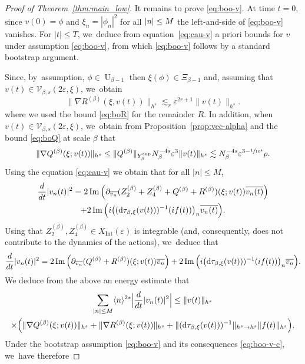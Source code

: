 \documentclass[JEP,XML,SOM,Unicode,published]{cedram}
\theoremstyle{plain}
\theoremstyle{definition}
\newcommand{\1}{\mathbf{1}}
\newcommand{\Ysup}[1]{Y_{#1}^{\mathrm{sup}}}
\let\epsilon\varepsilon
\begin{document}
\begin{proof}[Proof of Theorem~\ref{thm:main_low}]
It remains to prove \eqref{eq:boo-v}. At time $t=0$, since $v(0)=\phi$ and $\xi_{n}=|\phi_{n}|^{2}$ for all $|n|\leq\nobreak M$ the left-and-side of \eqref{eq:boo-v} vanishes. For $|t|\leq T$, we~deduce from equation~\eqref{eq:cau-v} a priori bounds for $v$ under assumption \eqref{eq:boo-v}, from which \eqref{eq:boo-v} follows by a standard bootstrap argument.

Since, by~assumption, $\phi\in\operatorname{U}_{\beta-1}$ then $\xi(\phi)\in\Xi_{\beta-1}$ and, assuming that $v(t)\in\mathcal{V}_{\beta,s}(2\epsilon,\xi)$, we~obtain
\[
\|\nabla R^{(\beta)}(\xi,v(t))\|_{h^{s}}\lesssim_{r}\epsilon^{2r+1}\|v(t)\|_{h^{s}}.
\]
where we used the bound \eqref{eq:boR} for the remainder $R$.
In addition, when $v(t)\in\mathcal{V}_{\beta,s}(2\epsilon,\xi)$, we~obtain from Proposition~\ref{prop:vec-alpha} and the bound \eqref{eq:boQ} at scale $\beta$ that
\begin{equation}
\label{eq:jeveuxteciterdanslintro}
\|\nabla Q^{(\beta)}(\xi;v(t))\|_{h^{s}} \leq \|Q^{(\beta)}\|_{\Ysup{\beta}}N_{\beta}^{-4s}\epsilon^{3}\|v(t)\|_{h^{s}}
\lesssim N_{\beta}^{-4s}\epsilon^{3-\sfrac{1}{10^{4}}}\rho.
\end{equation}
Using the equation \eqref{eq:cau-v} we obtain that for all $|n|\leq M$,
\begin{multline*}
\frac{d}{dt}|v_{n}(t)|^{2}
= 2\operatorname{Im}
\Big(
\partial_{\overline{v_{n}}}(Z_{2}^{(\beta)}+Z_{4}^{(\beta)}+Q^{(\beta)}+R^{(\beta)})(\xi;v(t))\overline{v_{n}(t)}
\Big) \\
+
2\operatorname{Im}
\Big(i
\big((\mathrm{d}\tau_{\beta,\xi}(v(t)))^{-1}(if(t))\big)_{n}\overline{v_{n}(t)}
\Big).
\end{multline*}
Using that $Z_{2}^{(\beta)},Z_{4}^{(\beta)}\in X_{\mathrm{Int}}(\epsilon)$ is integrable (and, consequently, does not contribute to the dynamics of the actions), we~deduce that
\[
\frac{d}{dt}|v_{n}(t)|^{2} =2\operatorname{Im}
\Big(
\partial_{\overline{v_{n}}}(Q^{(\beta)}+R^{(\beta)})(\xi;v(t))\overline{v_{n}}
\Big)
+
2\operatorname{Im}
\Big(i\big(\mathrm{d}\tau_{\beta,\xi}(v(t)))^{-1}(if(t))\big)_{n}\overline{v_{n}}
\Big).
\]
We deduce from the above an energy estimate that
\begin{multline*}
\sum_{|n|\leq M}\langle n\rangle^{2s}\Bigl|\frac{d}{dt}|v_{n}(t)|^{2}\Bigr| \leq \|v(t)\|_{h^{s}}
\\
\times\Big(
\|\nabla Q^{(\beta)}(\xi;v(t))\|_{h^{s}}
+
\|\nabla R^{(\beta)}(\xi;v(t))\|_{h^{s}}
+
\|(\mathrm{d}\tau_{\beta,\xi}(v(t)))^{-1}\|_{h^{s}\to h^{s}}\|f(t)\|_{h^{s}}
\Big).
\end{multline*}
Under the bootstrap assumption \eqref{eq:boo-v} and its consequences \eqref{eq:boo-v-c}, we~have therefore

\end{proof}
\end{document}
